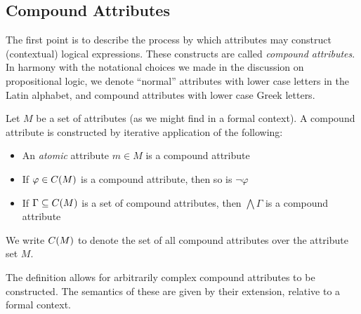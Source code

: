 \subsection{Compound Attributes}
\label{subsection:compound-attributes}

The first point is to describe the process by which attributes may construct (contextual) logical expressions. These constructs
are called \textit{compound attributes}. In harmony with the notational choices we made in the discussion on propositional
logic, we denote ``normal'' attributes with lower case letters in the Latin alphabet, and compound attributes with lower
case Greek letters.

\begin{definition}
	\label{definition:compound-attributes} 

	Let $M$ be a set of attributes (as we might find in a formal context). A compound attribute is constructed by iterative
	application of the following: 
	\begin{itemize}[itemsep=-0em]
		\item An \textit{atomic} attribute $m\in M$ is a compound attribute

		\item If $\varphi \in C(M)$ is a compound attribute, then so is $\neg \varphi$

		\item If $\Gamma \subseteq C(M)$ is a set of compound attributes, then $\bigwedge \Gamma$ is a compound attribute
	\end{itemize}
	We write $C(M)$ to denote the set of all compound attributes over the attribute set $M$.
\end{definition}

The definition allows for arbitrarily complex compound attributes to be constructed. The semantics of these are given by
their extension, relative to a formal context.

